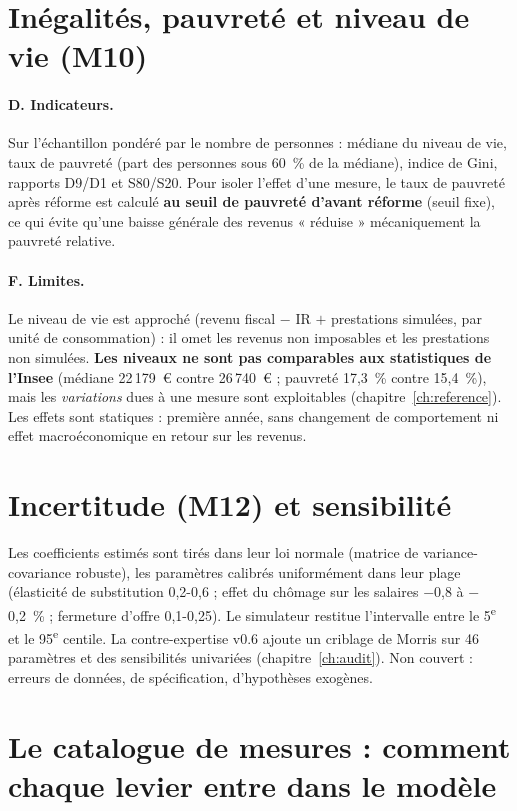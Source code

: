\section{Inégalités, pauvreté et niveau de vie (M10)}
\label{sec:inegalites}

\paragraph{D. Indicateurs.} Sur l'échantillon pondéré par le nombre de personnes : médiane du niveau de vie, taux de
pauvreté (part des personnes sous 60~\% de la médiane), indice de Gini, rapports D9/D1 et S80/S20. Pour isoler l'effet
d'une mesure, le taux de pauvreté après réforme est calculé \textbf{au seuil de pauvreté d'avant réforme} (seuil fixe),
ce qui évite qu'une baisse générale des revenus « réduise » mécaniquement la pauvreté relative.

\paragraph{F. Limites.} Le niveau de vie est approché (revenu fiscal $-$ IR $+$ prestations simulées, par unité de
consommation) : il omet les revenus non imposables et les prestations non simulées. \textbf{Les niveaux ne sont pas
comparables aux statistiques de l'Insee} (médiane 22\,179~€ contre 26\,740~€ ; pauvreté 17,3~\% contre 15,4~\%), mais
les \emph{variations} dues à une mesure sont exploitables (chapitre~\ref{ch:reference}). Les effets sont statiques :
première année, sans changement de comportement ni effet macroéconomique en retour sur les revenus.

\section{Incertitude (M12) et sensibilité}

Les coefficients estimés sont tirés dans leur loi normale (matrice de variance-covariance robuste), les paramètres
calibrés uniformément dans leur plage (élasticité de substitution 0,2-0,6 ; effet du chômage sur les salaires
$-$0,8 à $-$0,2~\% ; fermeture d'offre 0,1-0,25). Le simulateur restitue l'intervalle entre le 5\textsuperscript{e} et le
95\textsuperscript{e} centile. La contre-expertise v0.6 ajoute un criblage de Morris sur 46 paramètres et des
sensibilités univariées (chapitre~\ref{ch:audit}). Non couvert : erreurs de données, de spécification, d'hypothèses
exogènes.

\section{Le catalogue de mesures : comment chaque levier entre dans le modèle}
\label{sec:catalogue}

